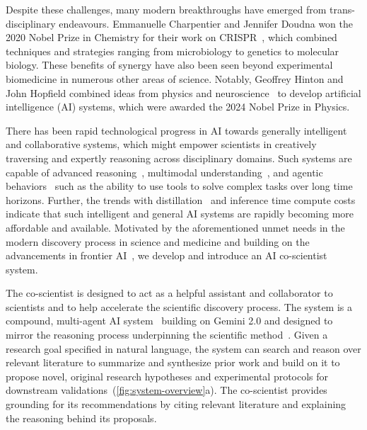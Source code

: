 Despite these challenges, many modern breakthroughs have emerged from trans-disciplinary endeavours. Emmanuelle Charpentier and Jennifer Doudna won the 2020 Nobel Prize in Chemistry for their work on CRISPR~\citep{jinek2012programmable}, which combined techniques and strategies ranging from microbiology to genetics to molecular biology. These benefits of synergy have also been seen beyond experimental biomedicine in numerous other areas of science. Notably, Geoffrey Hinton and John Hopfield combined ideas from physics and neuroscience~\citep{hopfield1982neural, hinton1986learning} to develop artificial intelligence (AI) systems, which were awarded the 2024 Nobel Prize in Physics.

There has been rapid technological progress in AI towards generally intelligent and collaborative systems, which might empower scientists in creatively traversing and expertly reasoning across disciplinary domains. Such systems are capable of advanced reasoning~\citep{guo2025deepseek, jaech2024openai, team2024gemini}, multimodal understanding~\citep{team2024gemini}, and agentic behaviors~\citep{wiesinger2024agents} such as the ability to use tools to solve complex tasks over long time horizons. Further, the trends with distillation~\cite{hinton2015distilling} and inference time compute costs~\citep{team2024gemini, team2024gemma} indicate that such intelligent and general AI systems are rapidly becoming more affordable and available. Motivated by the aforementioned unmet needs in the modern discovery process in science and medicine and building on the advancements in frontier AI~\citep{leslie2024frontier}, we develop and introduce an AI co-scientist system.

The co-scientist is designed to act as a helpful assistant and collaborator to scientists and to help accelerate the scientific discovery process. The system is a compound, multi-agent AI system~\cite{chen2024more} building on Gemini 2.0 and designed to mirror the reasoning process underpinning the scientific method~\citep{gower2012scientific}. Given a research goal specified in natural language, the system can search and reason over relevant literature to summarize and synthesize prior work and build on it to propose novel, original research hypotheses and experimental protocols for downstream validations~(\cref{fig:system-overview}a). The co-scientist provides grounding for its recommendations by citing relevant literature and explaining the reasoning behind its proposals. 

